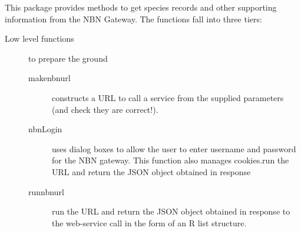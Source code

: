 \documentclass{article}
\begin{document}
This package provides methods to get species records and other supporting
information from the NBN Gateway. The functions fall into three tiers:
\begin{description}
  \item[Low level functions] to prepare the ground
  \begin{description}
    \item [makenbnurl] constructs a URL to call a service from the supplied
    parameters (and check they are correct!).
    \item [nbnLogin] uses dialog boxes to allow the user to enter username and
    password for the NBN gateway. This function also manages cookies.run the URL
    and return the JSON object obtained in response
    \item [runnbnurl] run the URL and return the JSON object obtained in response
    to the web-service call in the form of an R list structure.
  \end{description}
    

\end{description}
\end{document}
